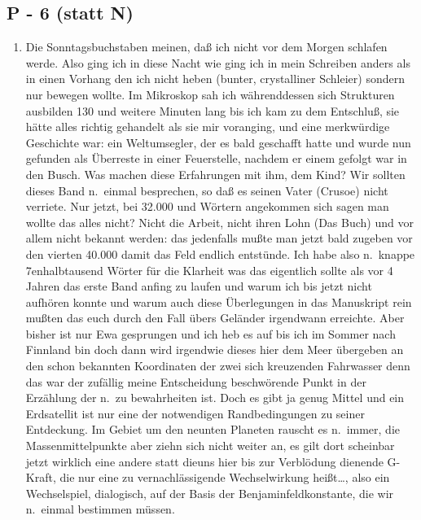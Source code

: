 \documentclass[
]{article}
\author{}
\date{\vspace{-2.5em}}
\providecommand{\tightlist}{%
  \setlength{\itemsep}{0pt}\setlength{\parskip}{0pt}}
\begin{document}
\subsection{P - 6 (statt N)}\label{p---6-statt-n}

\begin{enumerate}
\def\labelenumi{\arabic{enumi}.}
\setcounter{enumi}{4}
\tightlist
\item
  Die Sonntagsbuchstaben meinen, daß ich nicht vor dem Morgen schlafen
  werde. Also ging ich in diese Nacht wie ging ich in mein Schreiben
  anders als in einen Vorhang den ich nicht heben (bunter, crystalliner
  Schleier) sondern nur bewegen wollte. Im Mikroskop sah ich
  währenddessen sich Strukturen ausbilden 130 und weitere Minuten lang
  bis ich kam zu dem Entschluß, sie hätte alles richtig gehandelt als
  sie mir voranging, und eine merkwürdige Geschichte war: ein
  Weltumsegler, der es bald geschafft hatte und wurde nun gefunden als
  Überreste in einer Feuerstelle, nachdem er einem gefolgt war in den
  Busch. Was machen diese Erfahrungen mit ihm, dem Kind? Wir sollten
  dieses Band n.~einmal besprechen, so daß es seinen Vater (Crusoe)
  nicht verriete. Nur jetzt, bei 32.000 und Wörtern angekommen sich
  sagen man wollte das alles nicht? Nicht die Arbeit, nicht ihren Lohn
  (Das Buch) und vor allem nicht bekannt werden: das jedenfalls mußte
  man jetzt bald zugeben vor den vierten 40.000 damit das Feld endlich
  entstünde. Ich habe also n.~knappe 7enhalbtausend Wörter für die
  Klarheit was das eigentlich sollte als vor 4 Jahren das erste Band
  anfing zu laufen und warum ich bis jetzt nicht aufhören konnte und
  warum auch diese Überlegungen in das Manuskript rein mußten das euch
  durch den Fall übers Geländer irgendwann erreichte. Aber bisher ist
  nur Ewa gesprungen und ich heb es auf bis ich im Sommer nach Finnland
  bin doch dann wird irgendwie dieses hier dem Meer übergeben an den
  schon bekannten Koordinaten der zwei sich kreuzenden Fahrwasser denn
  das war der zufällig meine Entscheidung beschwörende Punkt in der
  Erzählung der n.~zu bewahrheiten ist. Doch es gibt ja genug Mittel und
  ein Erdsatellit ist nur eine der notwendigen Randbedingungen zu seiner
  Entdeckung. Im Gebiet um den neunten Planeten rauscht es n.~immer, die
  Massenmittelpunkte aber ziehn sich nicht weiter an, es gilt dort
  scheinbar jetzt wirklich eine andere statt dieuns hier bis zur
  Verblödung dienende G-Kraft, die nur eine zu vernachlässigende
  Wechselwirkung heißt\ldots, also ein Wechselspiel, dialogisch, auf der
  Basis der Benjaminfeldkonstante, die wir n.~einmal bestimmen müssen.

\end{enumerate}
\end{document}
